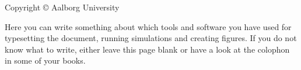\thispagestyle{empty}
{\small
\strut\vfill %
\noindent Copyright \copyright{} Aalborg University \the\year\par
\vspace{0.2cm}
\noindent Here you can write something about which tools and software you have used for typesetting the document, running simulations and creating figures. If you do not know what to write, either leave this page blank or have a look at the colophon in some of your books.
}
\newpage

